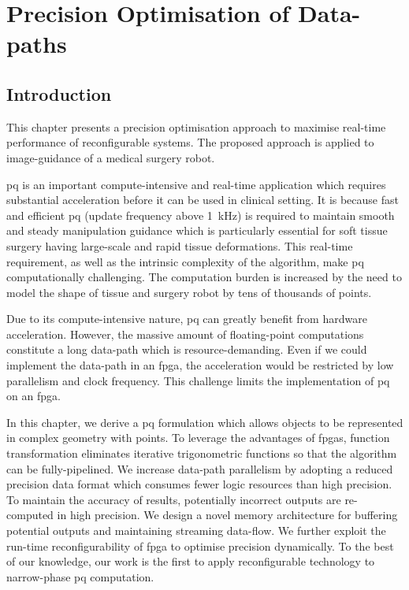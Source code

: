 
\chapter[Precision Optimisation of Data-paths]{Precision Optimisation of Data-paths}

\label{ch:precision}

\section{Introduction}
\label{sec:precision_intro}

This chapter presents a precision optimisation approach to maximise real-time performance of reconfigurable systems.
The proposed approach is applied to image-guidance of a medical surgery robot.

\gls{pq} is an important compute-intensive and real-time application which requires substantial acceleration before it can be used in clinical setting.
It is because fast and efficient \gls{pq} (update frequency above 1~kHz) is required to maintain smooth and steady manipulation guidance which is particularly essential for soft tissue surgery having large-scale and rapid tissue deformations.
This real-time requirement, as well as the intrinsic complexity of the algorithm, make \gls{pq} computationally challenging.
The computation burden is increased by the need to model the shape of tissue and surgery robot by tens of thousands of points.

Due to its compute-intensive nature, \gls{pq} can greatly benefit from hardware acceleration.
However, the massive amount of floating-point computations constitute a long data-path which is resource-demanding.
Even if we could implement the data-path in an \gls{fpga}, the acceleration would be restricted by low parallelism and clock frequency.
This challenge limits the implementation of \gls{pq} on an \gls{fpga}.

In this chapter, we derive a \gls{pq} formulation which allows objects to be represented in complex geometry with points.
To leverage the advantages of \glspl{fpga}, function transformation eliminates iterative trigonometric functions so that the algorithm can be fully-pipelined.
We increase data-path parallelism by adopting a reduced precision data format which consumes fewer logic resources than high precision.
To maintain the accuracy of results, potentially incorrect outputs are re-computed in high precision.
We design a novel memory architecture for buffering potential outputs and maintaining streaming data-flow.
We further exploit the run-time reconfigurability of \gls{fpga} to optimise precision dynamically.
To the best of our knowledge, our work is the first to apply reconfigurable technology to narrow-phase \gls{pq} computation.

